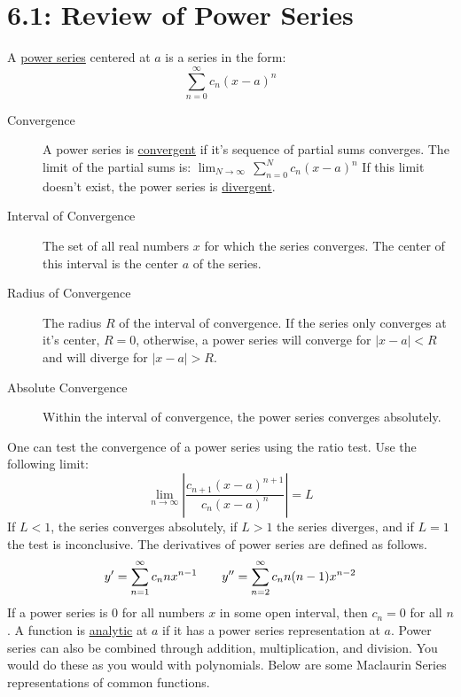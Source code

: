 \documentclass{article}
\begin{document}
\section*{6.1: Review of Power Series}
A \underline{power series} centered at \(a\) is a series in the form:
\[\sum_{n=0}^{\infty}c_n(x-a)^n\]
\begin{description}
    \item [Convergence] A power series is \underline{convergent} if it's sequence of partial sums converges. The limit of the partial sums is: \(\lim_{N\rightarrow\infty}\,\sum_{n=0}^Nc_n(x-a)^n\) If this limit doesn't exist, the power series is \underline{divergent}.
    \item [Interval of Convergence] The set of all real numbers \(x\) for which the series converges. The center of this interval is the center \(a\) of the series.
    \item [Radius of Convergence] The radius \(R\) of the interval of convergence. If the series only converges at it's center, \(R=0\), otherwise, a power series will converge for \(|x-a|<R\) and will diverge for \(|x-a|>R\).
    \item [Absolute Convergence] Within the interval of convergence, the power series converges absolutely.
\end{description}
One can test the convergence of a power series using the ratio test. Use the following limit:
\[\lim_{n\rightarrow\infty}\left|\frac{c_{n+1}(x-a)^{n+1}}{c_n(x-a)^n}\right|=L\]
If \(L<1\), the series converges absolutely, if \(L>1\) the series diverges, and if \(L=1\) the test is inconclusive.
\newline
\newline
The derivatives of power series are defined as follows.
\[y'=\sum_{n=1}^{\infty}c_nnx^{n-1}\hspace{7 mm}y''=\sum_{n=2}^{\infty}c_nn(n-1)x^{n-2}\]
If a power series is 0 for all numbers \(x\) in some open interval, then \(c_n=0\) for all \(n\). A function is \underline{analytic} at \(a\) if it has a power series representation at \(a\). Power series can also be combined through addition, multiplication, and division. You would do these as you would with polynomials. Below are some Maclaurin Series representations of common functions.\\\\
\def\arraystretch{1.5}%
\end{document}
